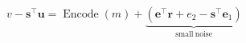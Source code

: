 \documentclass[border=6pt]{standalone}
\begin{document}
\color{ptitnavy}
\(\displaystyle v-\mathbf{s}^\top\mathbf{u}=\operatorname{Encode}(m)+\underbrace{(\mathbf{e}^\top\mathbf{r}+e_2-\mathbf{s}^\top\mathbf{e}_1)}_{\mathrm{small\ noise}}\)
\end{document}
